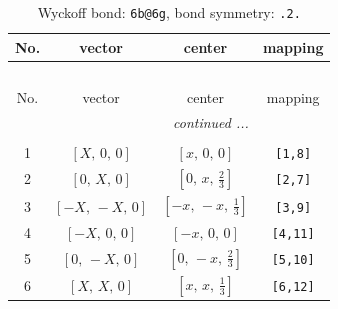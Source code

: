 \documentclass[fleqn,8pt]{jsarticle}
\begin{document}
\begin{longtable}{cccc}
\caption{Wyckoff bond: {\tt 6b@6g}, bond symmetry: {\tt .2.}}
 \\
 \hline \hline
No. & vector & center & mapping \\ \hline \endfirsthead

\multicolumn{3}{l}{\tablename\ \thetable{}} \\
 \hline \hline
No. & vector & center & mapping \\ \hline \endhead

 \hline \hline
\multicolumn{3}{r}{\footnotesize\it continued ...} \\ \endfoot

 \hline \hline
\multicolumn{3}{r}{} \\ \endlastfoot

1 & $\left[ X,\, 0,\, 0 \right]$ & $\left[ x,\, 0,\, 0 \right]$ & {\tt [1,8]} \\ \hline
2 & $\left[ 0,\, X,\, 0 \right]$ & $\left[ 0,\, x,\, \frac{2}{3} \right]$ & {\tt [2,7]} \\ \hline
3 & $\left[ - X,\, - X,\, 0 \right]$ & $\left[ - x,\, - x,\, \frac{1}{3} \right]$ & {\tt [3,9]} \\ \hline
4 & $\left[ - X,\, 0,\, 0 \right]$ & $\left[ - x,\, 0,\, 0 \right]$ & {\tt [4,11]} \\ \hline
5 & $\left[ 0,\, - X,\, 0 \right]$ & $\left[ 0,\, - x,\, \frac{2}{3} \right]$ & {\tt [5,10]} \\ \hline
6 & $\left[ X,\, X,\, 0 \right]$ & $\left[ x,\, x,\, \frac{1}{3} \right]$ & {\tt [6,12]} \\
\end{longtable}
\renewcommand{\arraystretch}{1.2}
\end{document}
